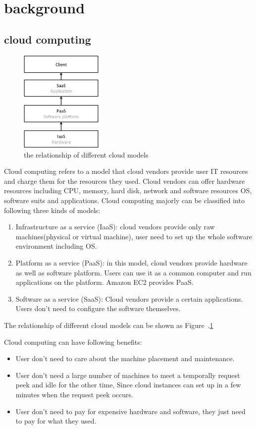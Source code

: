 \section{background}
\label{sec:background}
\subsection{cloud computing}
\begin{figure}
\centering
\includegraphics[width=4cm]{img/cloud_models.pdf}
\caption{the relationship of different cloud models}
\label{background:cloud models}
\end{figure}

Cloud computing refers to a model that cloud vendors provide user IT resources and charge them for
the resources they used.
Cloud vendors can offer hardware resources including CPU, memory, hard disk, network and software
resources OS, software suits and applications.
Cloud computing majorly can be classified into following three kinds of models:
\begin{enumerate}
  \item Infrastructure as a service (IaaS): cloud vendors provide only raw machines(physical or
  virtual machine), user need to set up the whole software environment including OS.
  \item Platform as a service (PaaS): in this model, cloud vendors provide hardware as well as
  software platform. Users can use it as a common computer and run applications on the platform.
  Amazon EC2 provides PaaS.
  \item Software as a service (SaaS): Cloud vendors provide a certain applications. Users don't need
  to configure the software themselves.
\end{enumerate}
The relationship of different cloud models can be shown as Figure~.\ref{background:cloud models}

Cloud computing can have following benefits:
\begin{itemize}
  \item User don't need to care about the machine placement and maintenance.
  \item User don't need a large number of machines to meet a temporally request peek and idle for
  the other time, Since cloud instances can set up in a few minutes when the request peek occurs.
  \item User don't need to pay for expensive hardware and software, they just need to pay for what
  they used.
\end{itemize}

